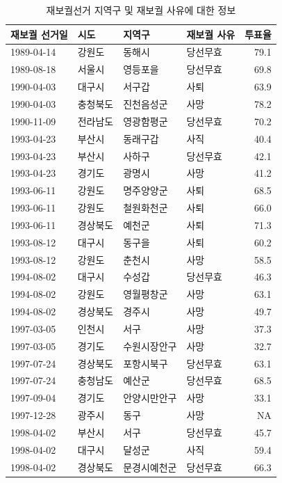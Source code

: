 \documentclass[
  11pt,
  letter]{article}
\begin{document}
\begin{longtable}[t]{l|l|l|l|r}
\caption{\label{tab:unnamed-chunk-21}재보궐선거 지역구 및 재보궐 사유에 대한 정보}\\
\hline
재보궐 선거일 & 시도 & 지역구 & 재보궐 사유 & 투표율\\
\hline
1989-04-14 & 강원도 & 동해시 & 당선무효 & 79.1\\
\hline
1989-08-18 & 서울시 & 영등포을 & 당선무효 & 69.8\\
\hline
1990-04-03 & 대구시 & 서구갑 & 사퇴 & 63.9\\
\hline
1990-04-03 & 충청북도 & 진천음성군 & 사망 & 78.2\\
\hline
1990-11-09 & 전라남도 & 영광함평군 & 당선무효 & 70.2\\
\hline
1993-04-23 & 부산시 & 동래구갑 & 사직 & 40.4\\
\hline
1993-04-23 & 부산시 & 사하구 & 당선무효 & 42.1\\
\hline
1993-04-23 & 경기도 & 광명시 & 사망 & 41.2\\
\hline
1993-06-11 & 강원도 & 명주양양군 & 사퇴 & 68.5\\
\hline
1993-06-11 & 강원도 & 철원화천군 & 사퇴 & 66.0\\
\hline
1993-06-11 & 경상북도 & 예천군 & 사퇴 & 71.3\\
\hline
1993-08-12 & 대구시 & 동구을 & 사퇴 & 60.2\\
\hline
1993-08-12 & 강원도 & 춘천시 & 사망 & 58.5\\
\hline
1994-08-02 & 대구시 & 수성갑 & 당선무효 & 46.3\\
\hline
1994-08-02 & 강원도 & 영월평창군 & 사망 & 63.1\\
\hline
1994-08-02 & 경상북도 & 경주시 & 사망 & 49.7\\
\hline
1997-03-05 & 인천시 & 서구 & 사망 & 37.3\\
\hline
1997-03-05 & 경기도 & 수원시장안구 & 사망 & 32.7\\
\hline
1997-07-24 & 경상북도 & 포항시북구 & 당선무효 & 63.1\\
\hline
1997-07-24 & 충청남도 & 예산군 & 당선무효 & 68.5\\
\hline
1997-09-04 & 경기도 & 안양시만안구 & 사망 & 33.1\\
\hline
1997-12-28 & 광주시 & 동구 & 사망 & NA\\
\hline
1998-04-02 & 부산시 & 서구 & 당선무효 & 45.7\\
\hline
1998-04-02 & 대구시 & 달성군 & 사직 & 59.4\\
\hline
1998-04-02 & 경상북도 & 문경시예천군 & 당선무효 & 66.3\\

\end{longtable}
\end{document}
